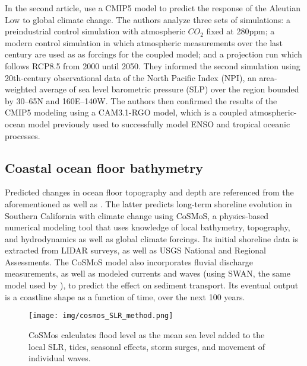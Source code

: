 \documentclass[12pt, letterpaper]{article}
\begin{document}
	In the second article, \citeauthor{swells-aleutian-low} use a CMIP5 model to predict the response of the Aleutian Low to global climate change. The authors analyze three sets of simulations: a preindustrial control simulation with atmospheric $CO_2$ fixed at 280ppm; a modern control simulation in which atmospheric measurements over the last century are used as as forcings for the coupled model; and a projection run which follows RCP8.5 from 2000 until 2050. They informed the second simulation using 20th-century observational data of the North Pacific Index (NPI), an area-weighted average of sea level barometric pressure (SLP) over the region bounded by 30\degree –65\degree N and 160\degree E–140\degree W. The authors then confirmed the results of the CMIP5 modeling using a CAM3.1-RGO model, which is a coupled atmospheric-ocean model previously used to successfully model ENSO and tropical oceanic processes. \citep{swells-aleutian-low}

	\subsection{Coastal ocean floor bathymetry}
	Predicted changes in ocean floor topography and depth are referenced from the aforementioned \citet{swells-deep-water-waves} as well as \citet{bath-cosmos}. The latter predicts long-term shoreline evolution in Southern California with climate change using CoSMoS, a physics-based numerical modeling tool that uses knowledge of local bathymetry, topography, and hydrodynamics as well as global climate forcings. Its initial shoreline data is extracted from LIDAR surveys, as well as USGS National and Regional Assessments. The CoSMoS model also incorporates fluvial discharge measurements, as well as modeled currents and waves (using SWAN, the same model used by \citet{swells-deep-water-waves}), to predict the effect on sediment transport. Its eventual output is a coastline shape as a function of time, over the next 100 years. 

	\begin{figure}[h]
		\centering
		\texttt{[image: img/cosmos\_SLR\_method.png]}
		\caption{CoSMos calculates flood level as the mean sea level added to the local SLR, tides, seasonal effects, storm surges, and movement of individual waves. \citep{bath-cosmos}}
	\end{figure} 
\end{document}
